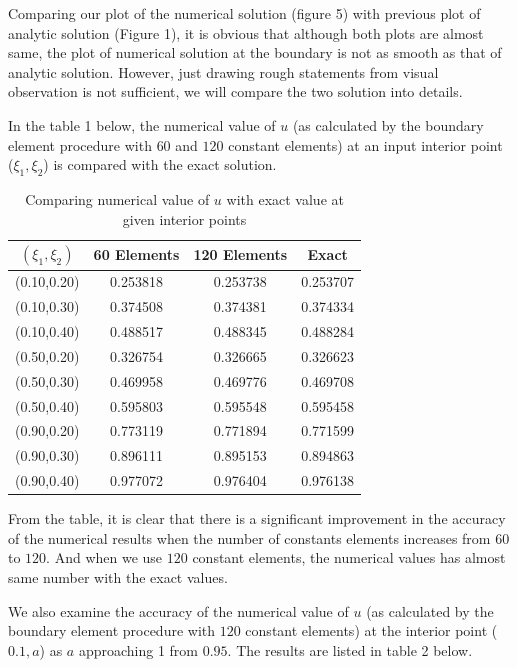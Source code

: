 \documentclass[a4paper,12pt]{article}
\begin{document}
\par Comparing our plot of the numerical solution (figure 5) with previous plot of analytic solution (Figure 1), it is obvious that although both plots are almost same, the plot of numerical solution at the boundary is not as smooth as that of analytic solution. However, just drawing rough statements from visual observation is not sufficient, we will compare the two solution into details.

In the table 1 below, the numerical value of $u$ (as calculated by the boundary element procedure with $60$ and $120$ constant elements) at an input interior point ($\xi_1, \xi_2$) is compared with the exact solution.   

\begin{table}[H]
\centering
\begin{tabular}{@{}cccc@{}}
\toprule
   $(\xi_1,\xi_2)$         & 60 Elements & 120 Elements & Exact    \\ \midrule
(0.10,0.20) & 0.253818     & 0.253738      & 0.253707 \\
(0.10,0.30) & 0.374508    & 0.374381     & 0.374334 \\
(0.10,0.40) & 0.488517     & 0.488345     & 0.488284 \\
(0.50,0.20) & 0.326754     & 0.326665      & 0.326623 \\
(0.50,0.30) & 0.469958     & 0.469776      & 0.469708 \\
(0.50,0.40) & 0.595803     & 0.595548      & 0.595458 \\
(0.90,0.20) & 0.773119    & 0.771894      & 0.771599 \\
(0.90,0.30) & 0.896111     & 0.895153      & 0.894863 \\
(0.90,0.40) & 0.977072     & 0.976404      & 0.976138 \\ \bottomrule
\end{tabular}
\caption{Comparing numerical value of $u$ with exact value at given interior points}
\label{tab:my-table}
\end{table}
\par From the table, it is clear that there is a significant improvement in the accuracy of the numerical results when the number of constants elements increases from $60$ to $120$. And when we use $120$ constant elements, the numerical values has almost same number with the exact values. 

\par We also examine the accuracy of the numerical value of $u$ (as calculated by the boundary element procedure with $120$ constant elements) at the interior point ($0.1, a$) as $a$ approaching 1 from $0.95$. The results are listed in table 2 below. 
\end{document}
